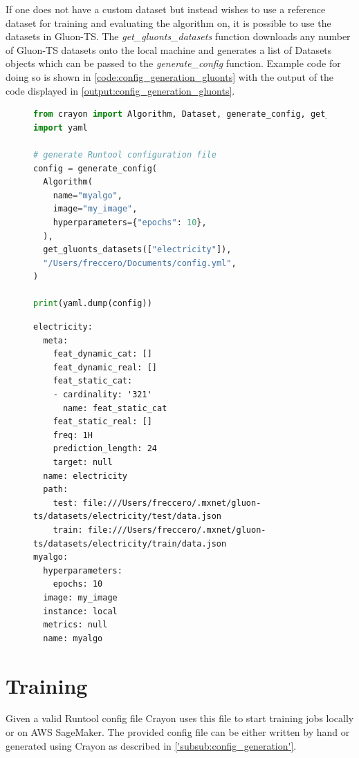 If one does not have a custom dataset but instead wishes to use a reference dataset for training and evaluating the algorithm on, it is possible to use the datasets in Gluon-TS. The \textit{get\_gluonts\_datasets} function downloads any number of Gluon-TS datasets onto the local machine and generates a list of Datasets objects which can be passed to the  \textit{generate\_config} function. Example code for doing so is shown in \ref{code:config_generation_gluonts} with the output of the code displayed in \ref{output:config_generation_gluonts}.

\begin{figure}[h]
  \begin{lstlisting}[language=Python, label={code:config_generation_gluonts}, caption={Config generation using Crayon with gluonts datasets}]
from crayon import Algorithm, Dataset, generate_config, get_gluonts_datasets
import yaml

# generate Runtool configuration file
config = generate_config(
  Algorithm(
    name="myalgo",
    image="my_image",
    hyperparameters={"epochs": 10},
  ),
  get_gluonts_datasets(["electricity"]),
  "/Users/freccero/Documents/config.yml",
)

print(yaml.dump(config))
    \end{lstlisting}
\end{figure}
\begin{figure}
  \begin{lstlisting}[label={output:config_generation_gluonts}, caption={Output when executing Code Fragment \ref{code:config_generation_gluonts}}]
electricity:
  meta:
    feat_dynamic_cat: []
    feat_dynamic_real: []
    feat_static_cat:
    - cardinality: '321'
      name: feat_static_cat
    feat_static_real: []
    freq: 1H
    prediction_length: 24
    target: null
  name: electricity
  path:
    test: file:///Users/freccero/.mxnet/gluon-ts/datasets/electricity/test/data.json
    train: file:///Users/freccero/.mxnet/gluon-ts/datasets/electricity/train/data.json
myalgo:
  hyperparameters:
    epochs: 10
  image: my_image
  instance: local
  metrics: null
  name: myalgo
    \end{lstlisting}
\end{figure}





\section{Training}
Given a valid Runtool config file Crayon uses this file to start training jobs locally or on AWS SageMaker. The provided config file can be either written by hand or generated using Crayon as described in \ref{'subsub:config_generation'}.


